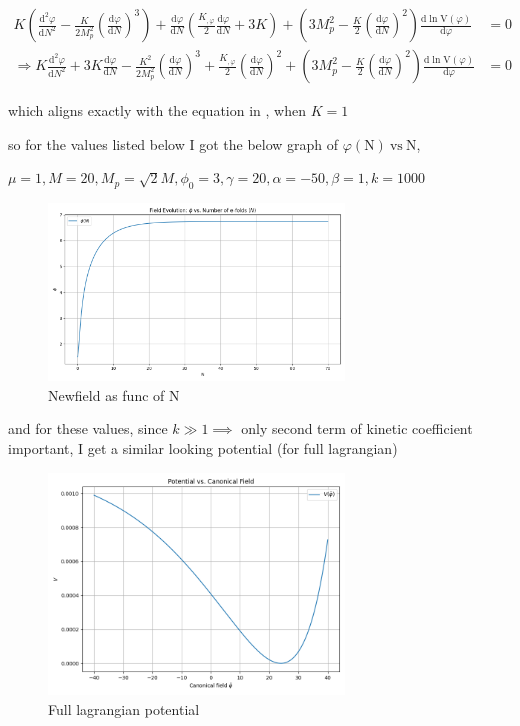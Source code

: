 \documentclass{article}
\begin{document}
\begin{align}
    K \left( \frac{\text{d}^2\varphi}{\text{d}N^2} - \frac{K}{2M_p^2} \left(\frac{\text{d}\varphi}{\text{d}N} \right)^3 \right) +  \frac{\text{d}\varphi}{\text{d}N} \left(\frac{K_{,\varphi}}{2} \frac{\text{d}\varphi}{\text{d}N}+ 3 K \right) + \left( 3 M_p^2 - \frac{K}{2} \left(\frac{\text{d}\varphi}{\text{d}N} \right)^2 \right) \frac{\text{d}\ln \text{V}(\varphi)}{\text{d} \varphi} &= 0 \nonumber \\
    \Rightarrow K\frac{\text{d}^2\varphi}{\text{d}N^2} +3 K \frac{\text{d}\varphi}{\text{d}N}  - \frac{K^2}{2M_p^2} \left(\frac{\text{d}\varphi}{\text{d}N} \right)^3  +  \frac{K_{,\varphi}}{2}  \left(\frac{\text{d}\varphi}{\text{d}N} \right)^2 +  \left( 3 M_p^2 - \frac{K}{2} \left(\frac{\text{d}\varphi}{\text{d}N} \right)^2 \right) \frac{\text{d}\ln \text{V}(\varphi)}{\text{d} \varphi} &= 0    
\end{align}

which aligns exactly with the equation in \cite{barker2024inflationarygravitationalwavesignatures}, when $K = 1$

so for the values listed below I got the below graph of $\varphi(\text{N}) \: \text{vs} \: \text{N}$,

$\mu = 1, M = 20  ,M_p = \sqrt2 M ,\phi_0 = 3, \gamma = 20 ,\alpha = -50 ,\beta = 1 ,k = 1000$

\begin{figure}[h!]
    \centering
    \includegraphics[width=0.7\textwidth]{Python/Figures/New Field as a function of N.png}
    \caption{Newfield as func of N}
    \label{Newfield as func of N}
\end{figure}

and for these values, since $k \gg 1 \implies$ only second term of kinetic coefficient important, I get a similar looking potential (for full lagrangian) 

\begin{figure}[h!]
    \centering
    \includegraphics[width=0.7\textwidth]{Python/Figures/Full lagriangian potential.png}
    \caption{Full lagrangian potential}
    \label{Full lagrangian potential}
\end{figure}

\newpage

\printbibliography
\end{document}

